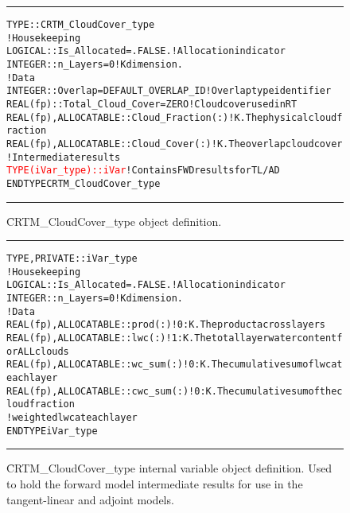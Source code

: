 \begin{figure}[htp]
  \caption{\f{CRTM\_CloudCover\_type} object definition.}
  \label{fig:CRTM_CloudCover_object}
  \noindent\rule[0.5ex]{\linewidth}{1pt}
  \centering
  \begin{alltt}
  TYPE :: CRTM_CloudCover_type
    ! Housekeeping
    LOGICAL :: Is_Allocated = .FALSE.                   ! Allocation indicator
    INTEGER :: n_Layers = 0                             ! K dimension.
    ! Data
    INTEGER  :: Overlap           = DEFAULT_OVERLAP_ID  ! Overlap type identifier
    REAL(fp) :: Total_Cloud_Cover = ZERO                ! Cloud cover used in RT
    REAL(fp), ALLOCATABLE :: Cloud_Fraction(:)          ! K. The physical cloud fraction
    REAL(fp), ALLOCATABLE :: Cloud_Cover(:)             ! K. The overlap cloud cover
    ! Intermediate results
    \textcolor{red}{TYPE(iVar_type) :: iVar}                             ! Contains FWD results for TL/AD
  END TYPE CRTM_CloudCover_type\end{alltt}
  \noindent\rule[0.5ex]{\linewidth}{1pt}
\end{figure}

\begin{figure}[htp]
  \caption{\f{CRTM\_CloudCover\_type} internal variable object definition. Used to hold the forward model intermediate results for use in the tangent-linear and adjoint models.}
  \label{fig:iVar_object}
  \noindent\rule[0.5ex]{\linewidth}{1pt}
  \centering
  \begin{alltt}
  TYPE, PRIVATE :: iVar_type
    ! Housekeeping
    LOGICAL :: Is_Allocated = .FALSE.    ! Allocation indicator
    INTEGER :: n_Layers = 0              ! K dimension.
    ! Data
    REAL(fp), ALLOCATABLE :: prod(:)     ! 0:K. The product across layers
    REAL(fp), ALLOCATABLE :: lwc(:)      ! 1:K. The total layer water content for ALL clouds
    REAL(fp), ALLOCATABLE :: wc_sum(:)   ! 0:K. The cumulative sum of lwc at each layer
    REAL(fp), ALLOCATABLE :: cwc_sum(:)  ! 0:K. The cumulative sum of the cloud fraction
    !                                           weighted lwc at each layer
  END TYPE iVar_type\end{alltt}
  \noindent\rule[0.5ex]{\linewidth}{1pt}
\end{figure}
